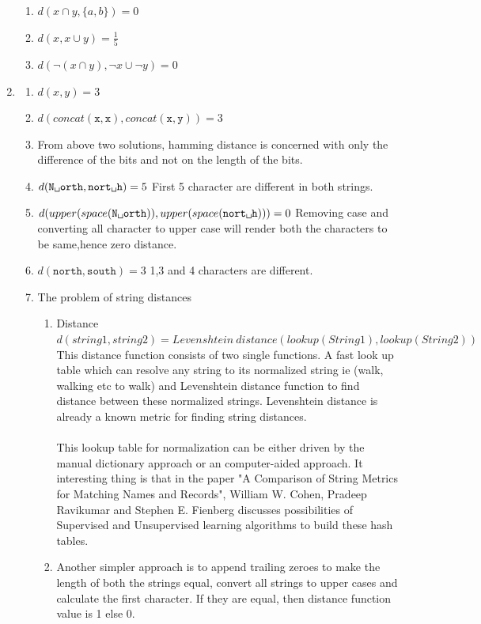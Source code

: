 \documentclass{article}
\begin{document}
\begin{enumerate}
\begin{enumerate}
\item $d(x\cap y, \{a, b\}) = 0$
\item $d(x, x \cup y) = \frac{1}{5}$
\item $d(\neg(x \cap y), \neg x \cup \neg y) = 0$
\end{enumerate}
\item
\begin{enumerate}
\item $d(x,y) = 3$
\item $d(concat(\texttt{x}, \texttt{x}), concat(\texttt{x},\texttt{y})) = 3$
\item From above two solutions, hamming distance is concerned with only the difference of the bits and not on the length of the bits. 
\item $d(\texttt{N\textvisiblespace orth}, \texttt{nort\textvisiblespace h}) = 5$ First 5 character are different in both strings.
\item $d(upper(space(\texttt{N\textvisiblespace orth})), upper(space(\texttt{nort\textvisiblespace h}))) = 0$ Removing case and converting all character to upper case will render both the characters to be same,hence zero distance.
\item $d(\texttt{north}, \texttt{south}) = 3$ 1,3 and 4 characters are different.
\item The problem of string distances
\begin{enumerate}
\item Distance $d(string1,string2)=Levenshtein \: distance (lookup(String1),lookup(String2))$\\
This distance function consists of two single functions. A fast look up table which can resolve any string to its normalized string ie (walk, walking etc to walk) and Levenshtein distance function to find distance between these normalized strings. Levenshtein distance is already a known metric for finding string distances. \\  \\ This lookup table for normalization can be either driven by the manual dictionary approach or an computer-aided approach. It interesting thing is that in the paper "A Comparison of String Metrics for Matching Names and Records", William W. Cohen, Pradeep Ravikumar and  Stephen E. Fienberg discusses possibilities of Supervised and Unsupervised learning algorithms to build these hash tables.
\item Another simpler approach is to append trailing zeroes to make the length of both the strings equal, convert all strings to upper cases and calculate the first character. If they are equal, then distance function value is 1 else 0.

\end{enumerate}
\end{enumerate}
\end{enumerate}
\end{document}
